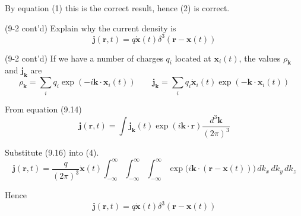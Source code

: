 By equation (1) this is the correct result,
hence (2) is correct.

\bigskip
(9-2 cont'd)
Explain why the current density is
\begin{equation*}
\mathbf j(\mathbf r,t)=q\dot{\mathbf x}(t)\delta^3(\mathbf r-\mathbf x(t))
\end{equation*}

(9-2 cont'd)
If we have a number of charges $q_i$ located at $\mathbf x_i(t)$,
the values $\rho_{\mathbf k}$ and $\mathbf j_{\mathbf k}$ are
\begin{equation*}
\rho_{\mathbf k}=\sum_iq_i\exp(-i\mathbf k\cdot\mathbf x_i(t))
\qquad
\mathbf j_{\mathbf k}
=\sum_iq_i\dot{\mathbf x}_i(t)
\exp(-\mathbf k\cdot\mathbf x_i(t))
\tag{9.16}
\end{equation*}

From equation (9.14)
\begin{equation*}
\mathbf j(\mathbf r,t)
=\int\mathbf j_{\mathbf k}(t)
\exp(i\mathbf k\cdot\mathbf r)
\frac{d^3\mathbf k}{(2\pi)^3}
\tag{4}
\end{equation*}

Substitute (9.16) into (4).
\begin{equation*}
\mathbf j(\mathbf r,t)
=\frac{q}{(2\pi)^3}\dot{\mathbf x}(t)
\int_{-\infty}^\infty
\int_{-\infty}^\infty
\int_{-\infty}^\infty
\exp\big(i\mathbf k\cdot(\mathbf r-\mathbf x(t))\big)
\,dk_x\,dk_y\,dk_z
\end{equation*}

Hence
\begin{equation*}
\mathbf j(\mathbf r,t)=q\dot{\mathbf x}(t)\delta^3(\mathbf r-\mathbf x(t))
\end{equation*}



